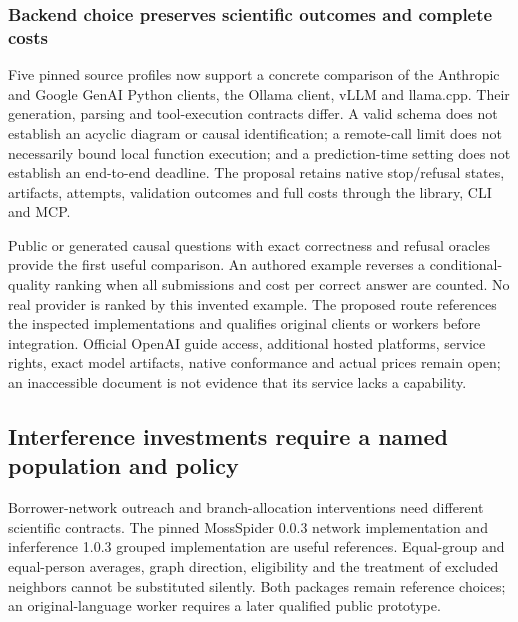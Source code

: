 \hypertarget{backend-choice-preserves-scientific-outcomes-and-complete-costs}{%
\subsubsection{Backend choice preserves scientific outcomes and complete
costs}\label{backend-choice-preserves-scientific-outcomes-and-complete-costs}}

Five pinned source profiles now support a concrete comparison of the
Anthropic and Google GenAI Python clients, the Ollama client, vLLM and
llama.cpp. Their generation, parsing and tool-execution contracts
differ. A valid schema does not establish an acyclic diagram or causal
identification; a remote-call limit does not necessarily bound local
function execution; and a prediction-time setting does not establish an
end-to-end deadline. The proposal retains native stop/refusal states,
artifacts, attempts, validation outcomes and full costs through the
library, CLI and MCP.
\citep{exec24_backend_anthropic,exec24_backend_google,exec24_backend_ollama,exec24_backend_vllm,exec24_backend_llamacpp,exec24_backend_reference}

Public or generated causal questions with exact correctness and refusal
oracles provide the first useful comparison. An authored example
reverses a conditional-quality ranking when all submissions and cost per
correct answer are counted. No real provider is ranked by this invented
example. The proposed route references the inspected implementations and
qualifies original clients or workers before integration. Official
OpenAI guide access, additional hosted platforms, service rights, exact
model artifacts, native conformance and actual prices remain open; an
inaccessible document is not evidence that its service lacks a
capability. \citep{exec24_backend_reference}

\hypertarget{interference-investments-require-a-named-population-and-policy}{%
\subsection{Interference investments require a named population and
policy}\label{interference-investments-require-a-named-population-and-policy}}

Borrower-network outreach and branch-allocation interventions need
different scientific contracts. The pinned MossSpider 0.0.3 network
implementation and inferference 1.0.3 grouped implementation are useful
references. Equal-group and equal-person averages, graph direction,
eligibility and the treatment of excluded neighbors cannot be
substituted silently. Both packages remain reference choices; an
original-language worker requires a later qualified public prototype.
\citep{exec24_interference_mossspider,exec24_interference_inferference}

